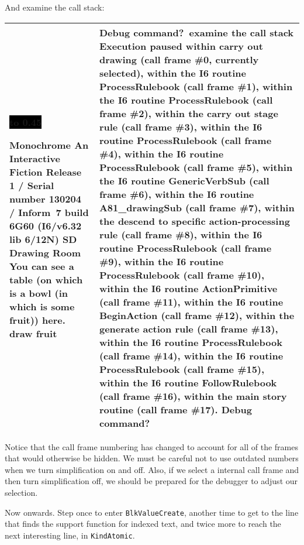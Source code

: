 \documentclass{book}
\newcommand{\n}{\hspace*{\fill}\newline}
\newcommand{\terp}[2]{\begin{center}\begin{tabular}{p{0.45\textwidth}|p{0.45\textwidth}}\midrule #1&#2\\\midrule\end{tabular}\end{center}}
\newcommand{\glkheading}[1]{\textbf{#1}}
\newcommand{\glkinput}[1]{\textbf{#1}}
\newcommand{\glkstatusline}[2]{\centerline{\colorbox{black}{\hbox to 0.45\textwidth{\textcolor{white}{#1\hfil #2}}}}}
\newcommand{\storyprompt}{\raisebox{1.5pt}{\(>\)}}
\newcommand{\cursor}{\raisebox{-1.5pt}{\RectangleThin}}
\begin{document}
And examine the call stack:

\terp{\glkstatusline{Drawing Room}{0/1}\n
  \glkheading{Monochrome}\n
  An Interactive Fiction\n
  Release 1 / Serial number 130204 / Inform~7 build 6G60 (I6/v6.32 lib 6/12N) SD\n
  \n
  \glkheading{Drawing Room}\n
  You can see a table (on which is a bowl (in which is some fruit)) here.\n
  \n
  \storyprompt\glkinput{draw fruit}}{%
  Debug command?\ \glkinput{examine the call stack}\n
  \n
  Execution paused\n
  within carry out drawing (call frame \#0, currently selected),\n
  within the I6 routine ProcessRulebook (call frame \#1),\n
  within the I6 routine ProcessRulebook (call frame \#2),\n
  within the carry out stage rule (call frame \#3),\n
  within the I6 routine ProcessRulebook (call frame \#4),\n
  within the I6 routine ProcessRulebook (call frame \#5),\n
  within the I6 routine GenericVerbSub (call frame \#6),\n
  within the I6 routine A81\_drawingSub (call frame \#7),\n
  within the descend to specific action-processing rule (call frame \#8),\n
  within the I6 routine ProcessRulebook (call frame \#9),\n
  within the I6 routine ProcessRulebook (call frame \#10),\n
  within the I6 routine ActionPrimitive (call frame \#11),\n
  within the I6 routine BeginAction (call frame \#12),\n
  within the generate action rule (call frame \#13),\n
  within the I6 routine ProcessRulebook (call frame \#14),\n
  within the I6 routine ProcessRulebook (call frame \#15),\n
  within the I6 routine FollowRulebook (call frame \#16),\n
  within the main story routine (call frame \#17).\n
  \n
  Debug command?\ \cursor}

Notice that the call frame numbering has changed to account for all of the
frames that would otherwise be hidden.  We must be careful not to use outdated
numbers when we turn simplification on and off.  Also, if we select a internal
call frame and then turn simplification off, we should be prepared for the
debugger to adjust our selection.

Now onwards.  Step once to enter \lstinline{BlkValueCreate}, another time to get
to the line that finds the support function for indexed text, and twice more to
reach the next interesting line, in \lstinline{KindAtomic}.
\end{document}
